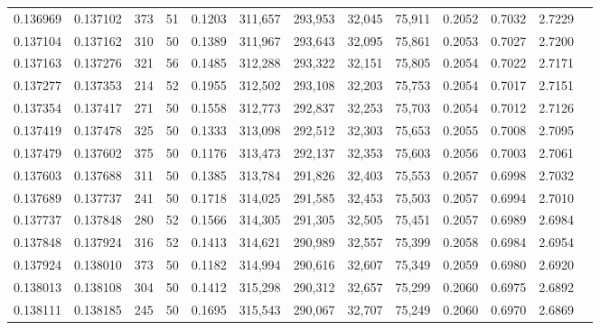 \begin{tabular}{rrrrrrrrrrrrr}
0.136969 & 0.137102 &   373 &  51 &                                     0.1203 & 311,657 & 293,953 &  32,045 &  75,911 & 0.2052 & 0.7032 & 2.7229 \\
0.137104 & 0.137162 &   310 &  50 &                                     0.1389 & 311,967 & 293,643 &  32,095 &  75,861 & 0.2053 & 0.7027 & 2.7200 \\
0.137163 & 0.137276 &   321 &  56 &                                     0.1485 & 312,288 & 293,322 &  32,151 &  75,805 & 0.2054 & 0.7022 & 2.7171 \\
0.137277 & 0.137353 &   214 &  52 &                                     0.1955 & 312,502 & 293,108 &  32,203 &  75,753 & 0.2054 & 0.7017 & 2.7151 \\
0.137354 & 0.137417 &   271 &  50 &                                     0.1558 & 312,773 & 292,837 &  32,253 &  75,703 & 0.2054 & 0.7012 & 2.7126 \\
0.137419 & 0.137478 &   325 &  50 &                                     0.1333 & 313,098 & 292,512 &  32,303 &  75,653 & 0.2055 & 0.7008 & 2.7095 \\
0.137479 & 0.137602 &   375 &  50 &                                     0.1176 & 313,473 & 292,137 &  32,353 &  75,603 & 0.2056 & 0.7003 & 2.7061 \\
0.137603 & 0.137688 &   311 &  50 &                                     0.1385 & 313,784 & 291,826 &  32,403 &  75,553 & 0.2057 & 0.6998 & 2.7032 \\
0.137689 & 0.137737 &   241 &  50 &                                     0.1718 & 314,025 & 291,585 &  32,453 &  75,503 & 0.2057 & 0.6994 & 2.7010 \\
0.137737 & 0.137848 &   280 &  52 &                                     0.1566 & 314,305 & 291,305 &  32,505 &  75,451 & 0.2057 & 0.6989 & 2.6984 \\
0.137848 & 0.137924 &   316 &  52 &                                     0.1413 & 314,621 & 290,989 &  32,557 &  75,399 & 0.2058 & 0.6984 & 2.6954 \\
0.137924 & 0.138010 &   373 &  50 &                                     0.1182 & 314,994 & 290,616 &  32,607 &  75,349 & 0.2059 & 0.6980 & 2.6920 \\
0.138013 & 0.138108 &   304 &  50 &                                     0.1412 & 315,298 & 290,312 &  32,657 &  75,299 & 0.2060 & 0.6975 & 2.6892 \\
0.138111 & 0.138185 &   245 &  50 &                                     0.1695 & 315,543 & 290,067 &  32,707 &  75,249 & 0.2060 & 0.6970 & 2.6869 \\

\end{tabular}
